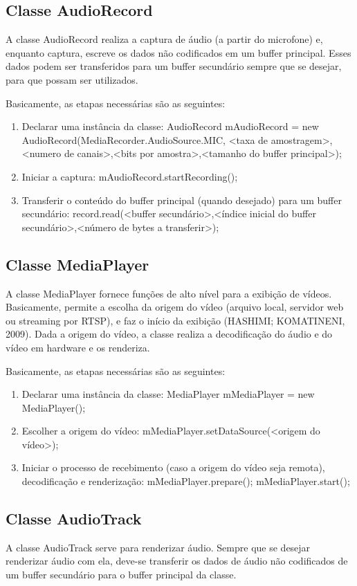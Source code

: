 \documentclass{acm_proc_article-sp}
\begin{document}
\subsection{Classe AudioRecord}
A classe AudioRecord realiza a captura de áudio (a partir do microfone) e, enquanto captura, escreve os dados não codificados em um buffer principal. Esses dados podem ser transferidos para um buffer secundário sempre que se desejar, para que possam ser utilizados.

Basicamente, as etapas necessárias são as seguintes:
\begin{enumerate}
 \item Declarar uma instância da classe:
AudioRecord mAudioRecord = new AudioRecord(MediaRecorder.AudioSource.MIC, <taxa de amostragem>,<numero de canais>,<bits por amostra>,<tamanho do buffer principal>);
 \item Iniciar a captura:
mAudioRecord.startRecording();
 \item Transferir o conteúdo do buffer principal (quando desejado) para um buffer secundário:
record.read(<buffer secundário>,<índice inicial do buffer secundário>,<número de bytes a transferir>);
\end{enumerate}

\subsection{Classe MediaPlayer}
A classe MediaPlayer fornece funções de alto nível para a exibição de vídeos. Basicamente, permite a escolha da origem do vídeo (arquivo local, servidor web ou streaming por RTSP), e faz o início da exibição (HASHIMI; KOMATINENI, 2009). Dada a origem do vídeo, a classe realiza a decodificação do áudio e do vídeo em hardware e os renderiza.

Basicamente, as etapas necessárias são as seguintes:
\begin{enumerate}
 \item Declarar uma instância da classe:
MediaPlayer mMediaPlayer = new MediaPlayer();
 \item Escolher a origem do vídeo:
mMediaPlayer.setDataSource(<origem do vídeo>);
 \item Iniciar o processo de recebimento (caso a origem do vídeo seja remota), decodificação e renderização:
mMediaPlayer.prepare();
mMediaPlayer.start();
\end{enumerate}

\subsection{Classe AudioTrack}
A classe AudioTrack serve para renderizar áudio. Sempre que se desejar renderizar áudio com ela, deve-se transferir os dados de áudio não codificados de um buffer secundário para o buffer principal da classe.
\end{document}
